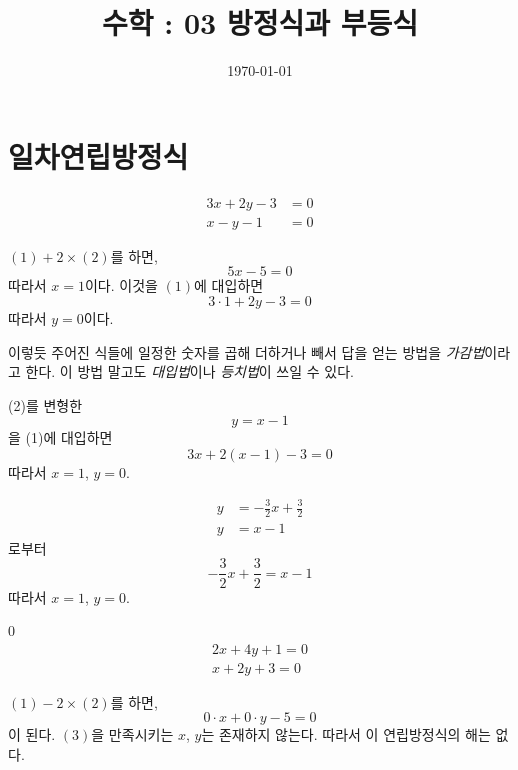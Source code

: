 \documentclass{oblivoir}
\begin{document}
\title{수학 : 03 방정식과 부등식}
\author{}
\date{\today}
\maketitle
\tableofcontents
\newpage

\section{일차연립방정식}

%
\exam{}\label{system1}
\begin{align}
3x+2y-3&=0\\
x-y-1&=0
\end{align}

\((1)+2\times(2)\)를 하면,
\[5x-5=0\]
따라서 \(x=1\)이다.
이것을 \((1)\)에 대입하면
\[3\cdot1+2y-3=0\tag{3}\]
따라서 \(y=0\)이다.

이렇듯 주어진 식들에 일정한 숫자를 곱해 더하거나 빼서 답을 얻는 방법을 \emph{가감법}이라고 한다.
이 방법 말고도 \emph{대입법}이나 \emph{등치법}이 쓰일 수 있다.

\bigskip\bigskip\bigskip
\begin{minipage}{.45\textwidth}
\begin{mdframed}[frametitle=대입법]
(2)를 변형한
\[y=x-1\]
을 (1)에 대입하면
\[3x+2(x-1)-3=0\]
따라서 \(x=1\), \(y=0\).
\end{mdframed}
\end{minipage}
\begin{minipage}{.45\textwidth}
\begin{mdframed}[frametitle=등치법]
\vspace{-15pt}
\begin{align*}
y&=-\frac32x+\frac32\\
y&=x-1
\end{align*}
로부터
\[-\frac32x+\frac32=x-1\]
따라서 \(x=1\), \(y=0\).
\end{mdframed}
\end{minipage}

\clearpage
%
\exam{}\label{system2}
\setcounter{equation}0
\begin{align}
2x+4y+1=0\\
x+2y+3=0
\end{align}

\((1)-2\times(2)\)를 하면,
\[0\cdot x+0\cdot y-5=0\tag{3}\]
이 된다.
\((3)\)을 만족시키는 \(x\), \(y\)는 존재하지 않는다.
따라서 이 연립방정식의 해는 없다.
\end{document}
